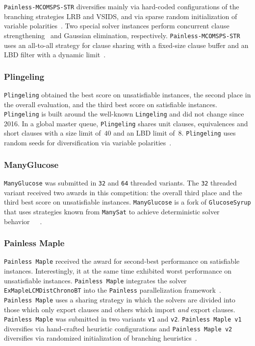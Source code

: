 \documentclass{elsarticle}
\newcommand{\solver}[1]{\texttt{#1}}
\begin{document}
\solver{Painless-MCOMSPS-STR} diversifies mainly via hard-coded configurations of the branching strategies LRB and VSIDS, and via sparse random initialization of variable polarities~\cite{Balyo:2015:HordeSATs}. 
Two special solver instances perform concurrent clause strengthening~\cite{Wieringa:2013:CCS} and Gaussian elimination, respectively. 
\solver{Painless-MCOMSPS-STR} uses an all-to-all strategy for clause sharing with a fixed-size clause buffer and an LBD filter with a dynamic limit~\cite{SC2020}. 


\subsubsection{Plingeling} 

\solver{Plingeling} obtained the best score on unsatisfiable instances, the second place in the overall evaluation, and the third best score on satisfiable instances. 
\solver{Plingeling} is built around the well-known \solver{Lingeling} and did not change since 2016. 
In a global master queue, \solver{Plingeling} shares unit clauses, equivalences and short clauses with a size limit of~$40$ and an LBD limit of~$8$. 
\solver{Plingeling} uses random seeds for diversification via variable polarities~\cite{Biere:SC2020,Biere:2012:Lingeling}. 


\subsubsection{ManyGlucose}

\solver{ManyGlucose} was submitted in \solver{32} and \solver{64} threaded variants. 
The \solver{32} threaded variant received two awards in this competition: the overall third place and the third best score on unsatisfiable instances. 
\solver{ManyGlucose} is a fork of \solver{GlucoseSyrup} that uses strategies known from \solver{ManySat} to achieve deterministic solver behavior~\cite{Audemard:2018:GlucoseSyrup}~\cite{Audemard:2014:LazyClauseExchange}~\cite{Hamadi:2009:ManySat}. 


\subsubsection{Painless Maple} 

\solver{Painless Maple} received the award for second-best performance on satisfiable instances. Interestingly, it 
at the same time exhibited  worst performance on unsatisfiable instances. 
\solver{Painless Maple} integrates the solver \solver{ExMapleLCMDistChronoBT} into the \solver{Painless} parallelization framework~\cite{Frioux:2017:Painless}. 
\solver{Painless Maple} uses a sharing strategy in which the solvers are divided into those which only export clauses and others which import \emph{and} export clauses. 
\solver{Painless Maple} was submitted in two variants \solver{v1} and \solver{v2}. 
\solver{Painless Maple v1} diversifies via hand-crafted heuristic configurations and \solver{Painless Maple v2} diversifies via randomized initialization of branching heuristics~\cite{SC2020}. 
\end{document}
